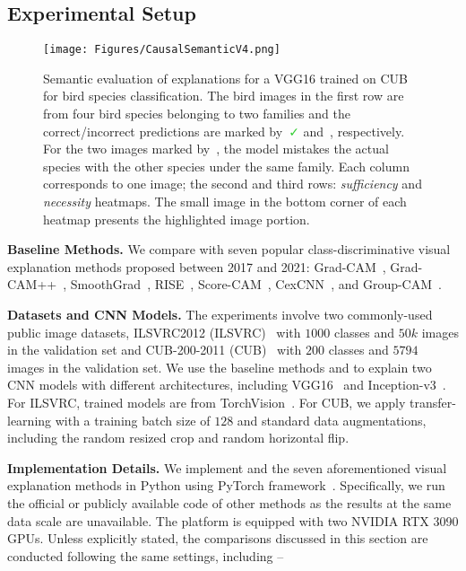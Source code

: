 \subsection{Experimental Setup}
\begin{figure*}[htbp]
  \centering
   \texttt{[image: Figures/CausalSemanticV4.png]}
\caption{
Semantic evaluation of \name{} explanations for a VGG16 trained on CUB for bird species classification.
The bird images in the first row are from four bird species belonging to two families and the correct/incorrect predictions are marked by~\textcolor{LimeGreen}{\faCheck} and~\textcolor{red}{\faTimes}, respectively.
For the two images marked by~\textcolor{red}{\faTimes}, the model mistakes the actual species with the other species under the same family.
Each column corresponds to one image; the second and third rows: \textit{sufficiency} and \textit{necessity} heatmaps.
The small image in the bottom corner of each heatmap presents the highlighted image portion.}
\label{fig:Bird Causal}
\end{figure*}

\noindent \textbf{Baseline Methods.}
We compare \name{} with seven popular class-discriminative visual explanation methods proposed between 2017 and 2021: Grad-CAM~\cite{selvaraju2017grad}, Grad-CAM++~\cite{chattopadhay2018grad}, SmoothGrad~\cite{smilkov2017smoothgrad}, RISE~\cite{petsiuk2018rise}, Score-CAM~\cite{wang2019score}, CexCNN~\cite{debbi2021causal}, and Group-CAM~\cite{zhang2021group}.

\noindent \textbf{Datasets and CNN Models.}
The experiments involve two commonly-used public image datasets, ILSVRC2012 (ILSVRC)~\cite{ILSVRC15} with $1000$ classes and $50k$ images in the validation set and CUB-200-2011 (CUB)~\cite{welinder2010caltech} with $200$ classes and $5794$ images in the validation set.
We use the baseline methods and \name{} to explain two CNN models with different architectures, including VGG16~\cite{simonyan2014very} and Inception-v3~\cite{szegedy2016rethinking}.
For ILSVRC, trained models are from TorchVision~\cite{marcel2010torchvision}.
For CUB, we apply transfer-learning with a training batch size of $128$ and standard data augmentations, including the random resized crop and random horizontal flip.

\noindent \textbf{Implementation Details.}
We implement \name{} and the seven aforementioned visual explanation methods in Python using PyTorch framework~\cite{paszke2017automatic}.
Specifically, we run the official or publicly available code of other methods as the results at the same data scale are unavailable.
The platform is equipped with two NVIDIA RTX 3090 GPUs. 
Unless explicitly stated, the comparisons discussed in this section are conducted following the same settings, including --

